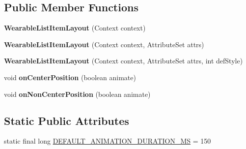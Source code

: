 \subsection*{Public Member Functions}
\begin{DoxyCompactItemize}
\item 
{\bfseries Wearable\+List\+Item\+Layout} (Context context)\hypertarget{classcom_1_1google_1_1devrel_1_1wcl_1_1widgets_1_1list_1_1WearableListItemLayout_a6788fbbfbb4174a301520ac6aa66141e}{}\label{classcom_1_1google_1_1devrel_1_1wcl_1_1widgets_1_1list_1_1WearableListItemLayout_a6788fbbfbb4174a301520ac6aa66141e}

\item 
{\bfseries Wearable\+List\+Item\+Layout} (Context context, Attribute\+Set attrs)\hypertarget{classcom_1_1google_1_1devrel_1_1wcl_1_1widgets_1_1list_1_1WearableListItemLayout_a46b565d2469be765023ed0ac0203c3c1}{}\label{classcom_1_1google_1_1devrel_1_1wcl_1_1widgets_1_1list_1_1WearableListItemLayout_a46b565d2469be765023ed0ac0203c3c1}

\item 
{\bfseries Wearable\+List\+Item\+Layout} (Context context, Attribute\+Set attrs, int def\+Style)\hypertarget{classcom_1_1google_1_1devrel_1_1wcl_1_1widgets_1_1list_1_1WearableListItemLayout_ad068b161e809e35cad0dcd9a32ecbf02}{}\label{classcom_1_1google_1_1devrel_1_1wcl_1_1widgets_1_1list_1_1WearableListItemLayout_ad068b161e809e35cad0dcd9a32ecbf02}

\item 
void {\bfseries on\+Center\+Position} (boolean animate)\hypertarget{classcom_1_1google_1_1devrel_1_1wcl_1_1widgets_1_1list_1_1WearableListItemLayout_a604a63c6b2eed936d40857ab97ea5fad}{}\label{classcom_1_1google_1_1devrel_1_1wcl_1_1widgets_1_1list_1_1WearableListItemLayout_a604a63c6b2eed936d40857ab97ea5fad}

\item 
void {\bfseries on\+Non\+Center\+Position} (boolean animate)\hypertarget{classcom_1_1google_1_1devrel_1_1wcl_1_1widgets_1_1list_1_1WearableListItemLayout_a3aab72425675a7b5ca8852b4cd624bdd}{}\label{classcom_1_1google_1_1devrel_1_1wcl_1_1widgets_1_1list_1_1WearableListItemLayout_a3aab72425675a7b5ca8852b4cd624bdd}

\end{DoxyCompactItemize}
\subsection*{Static Public Attributes}
\begin{DoxyCompactItemize}
\item 
static final long \hyperlink{classcom_1_1google_1_1devrel_1_1wcl_1_1widgets_1_1list_1_1WearableListItemLayout_a845225e253377b50a78a65b087d52a13}{D\+E\+F\+A\+U\+L\+T\+\_\+\+A\+N\+I\+M\+A\+T\+I\+O\+N\+\_\+\+D\+U\+R\+A\+T\+I\+O\+N\+\_\+\+MS} = 150
\end{DoxyCompactItemize}
